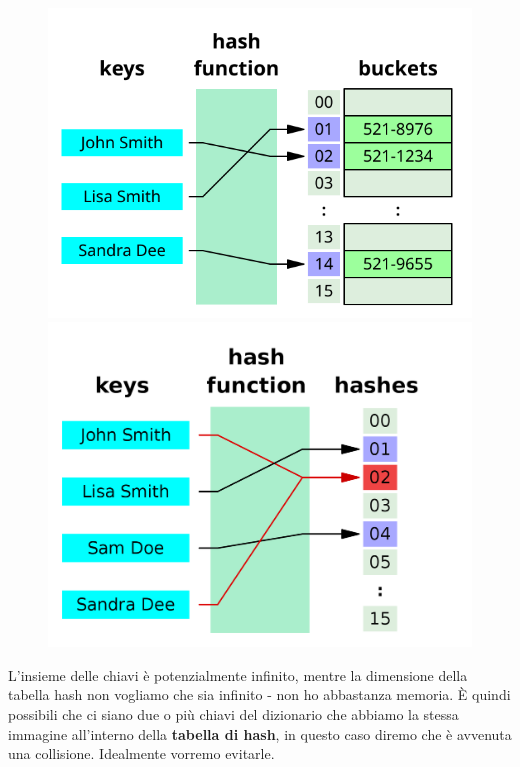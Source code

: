 \begin{flushleft}
    \begin{figure}[h]
        \begin{minipage}[t]{0.45\textwidth}
            \centering
            \includegraphics[width=\textwidth]{img/hash_table.png}
        \end{minipage}
        \hfill
        \begin{minipage}[t]{0.45\textwidth}
            \centering
            \includegraphics[width=\textwidth]{img/hash_table_coll.png}
        \end{minipage}
    \end{figure}

    L'insieme delle chiavi è potenzialmente infinito, mentre la dimensione della tabella hash non vogliamo che sia infinito - non ho abbastanza memoria. È quindi possibili che ci siano due o più chiavi del dizionario che abbiamo la stessa immagine all'interno della \textbf{tabella di hash}, in questo caso diremo che è avvenuta una collisione. Idealmente vorremo evitarle.


\end{flushleft}
